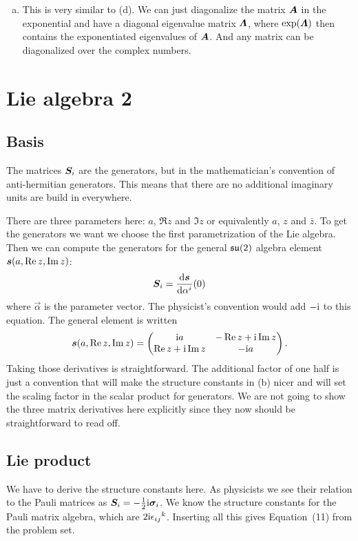 \documentclass[11pt, english, fleqn, DIV=15, headinclude, BCOR=1cm]{scrartcl}
\begin{document}
\begin{enumerate}[(a)]
    \item
        This is very similar to (d). We can just diagonalize the matrix $\mat
        A$ in the exponential and have a diagonal eigenvalue matrix $\mat
        \Lambda$, where $\exp(\mat \Lambda)$ then contains the exponentiated
        eigenvalues of $\mat A$. And any matrix can be diagonalized over the
        complex numbers.
\end{enumerate}

\section{Lie algebra 2}
\label{homework:3}

\subsection{Basis}

The matrices $\mat S_i$ are the generators, but in the mathematician's
convention of anti-hermitian generators. This means that there are no
additional imaginary units are build in everywhere.

There are three parameters here: $a$, $\Re z$ and $\Im z$ or equivalently $a$,
$z$ and $\overline z$. To get the generators we want we choose the first
parametrization of the Lie algebra. Then we can compute the generators for the
general $\mathfrak{su}(2)$ algebra element $\mat s(a, \Re z, \Im z)$:
\[
    \mat S_i = \od{\mat s}{\alpha^i}(0)
\]
where $\vec \alpha$ is the parameter vector. The physicist's convention would
add $-\mathrm i$ to this equation. The general element is written
\[
    \mat s(a, \Re z, \Im z) =
    \begin{pmatrix}
        \iup a & - \Re z + \iup \Im z \\
        \Re z + \iup \Im z & - \iup a \\
    \end{pmatrix}.
\]
Taking those derivatives is straightforward. The additional factor of one half
is just a convention that will make the structure constants in (b) nicer and
will set the scaling factor in the scalar product for generators. We are not
going to show the three matrix derivatives here explicitly since they now
should be straightforward to read off.

\subsection{Lie product}

We have to derive the structure constants here. As physicists we see their
relation to the Pauli matrices as $\mat S_i = - \half \iup \mat \sigma_i$. We
know the structure constants for the Pauli matrix algebra, which are $2 \mathrm i
\epsilon_{ij}{}^k$. Inserting all this gives Equation~(11) from the problem
set.
\end{document}
